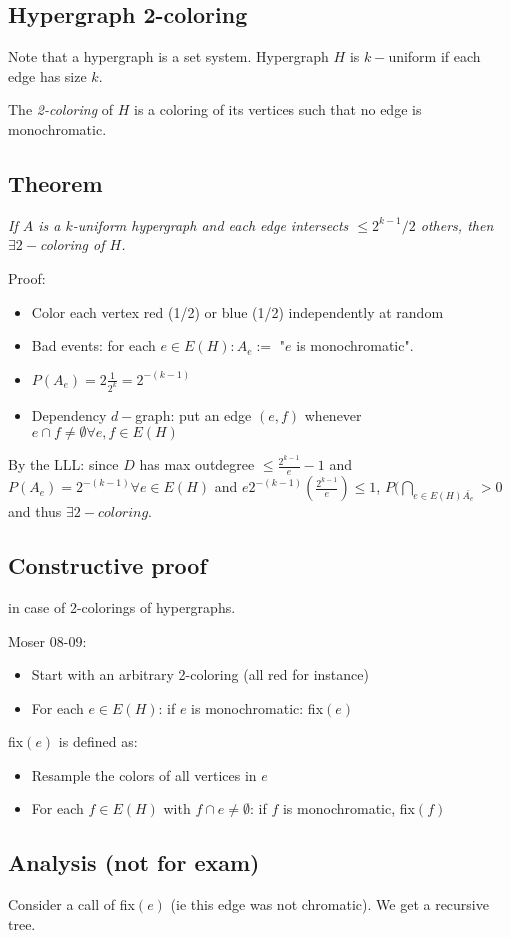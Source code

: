 \subsection{Hypergraph 2-coloring}
Note that a hypergraph is a set system. Hypergraph $H$ is $k-$uniform if each edge has size $k$.

The \textit{2-coloring} of $H$ is a coloring of its vertices such that no edge is monochromatic.

\subsection{Theorem} 
\textit{If $A$ is a $k$-uniform hypergraph and each edge intersects $\leq 2^{k-1}/2$ others, then $\exists 2-$coloring of $H$.}

Proof: \begin{itemize}
	\item Color each vertex red (1/2) or blue (1/2) independently at random
	\item Bad events: for each $e \in E(H) : A_e := $ "$e$ is monochromatic".
	\item $P(A_e) = 2 \frac{1}{2^k} = 2^{-(k-1)}$
	\item Dependency $d-$graph: put an edge $(e,f)$ whenever $e \cap f \neq \emptyset \forall e, f \in E(H)$
\end{itemize}

By the LLL: since $D$ has max outdegree $\leq \frac{2^{k-1}}{e} -1$ and $P(A_e) = 2^{-(k-1)} \forall e \in E(H)$ and $e 2^{-(k-1)} \left( \frac{2^{k-1}}{e} \right) \leq 1$, $P(\bigcap_{e \in E(H) \bar{A_e}} > 0$ and thus $\exists 2-coloring$.

\subsection{Constructive proof}
in case of 2-colorings of hypergraphs.

Moser 08-09:
\begin{itemize}
	\item Start with an arbitrary 2-coloring (all red for instance)
	\item For each $e \in E(H)$: if $e$ is monochromatic: fix$(e)$
\end{itemize}

fix$(e)$ is defined as:
\begin{itemize}
	\item Resample the colors of all vertices in $e$
	\item For each $f \in E(H)$ with $f \cap e \neq \emptyset$: if $f$ is monochromatic, fix$(f)$
\end{itemize}


\subsection{Analysis (not for exam)}
Consider a call of fix$(e)$ (ie this edge was not chromatic). We get a recursive tree.


